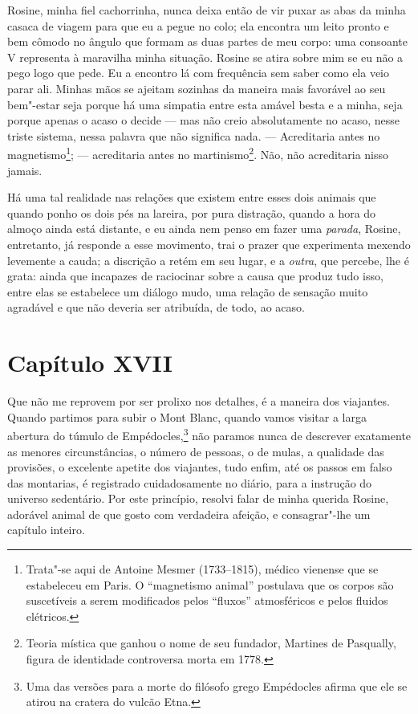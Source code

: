  Rosine, minha fiel cachorrinha, nunca deixa então de vir puxar as abas
da minha casaca de viagem para que eu a pegue no colo; ela encontra um
leito pronto e bem cômodo no ângulo que formam as duas partes de meu
corpo: uma consoante V representa à maravilha minha situação. Rosine se
atira sobre mim se eu não a pego logo que pede. Eu a encontro lá com
frequência sem saber como ela veio parar ali. Minhas mãos se ajeitam
sozinhas da maneira mais favorável ao seu bem"-estar seja porque há uma
simpatia entre esta amável besta e a minha, seja porque apenas o acaso
o decide --- mas não creio absolutamente no acaso, nesse triste
sistema, nessa palavra que não significa nada. --- Acreditaria antes no
magnetismo\footnote{ Trata"-se aqui de Antoine Mesmer (1733--1815),
médico vienense que se estabeleceu em Paris. O ``magnetismo animal''
postulava que os corpos são suscetíveis a serem modificados pelos
``fluxos'' atmosféricos e pelos fluidos elétricos.}; --- acreditaria
antes no martinismo\footnote{ Teoria mística que ganhou o nome de seu
fundador, Martines de Pasqually, figura de identidade controversa morta
em 1778.}. Não, não acreditaria nisso jamais. 

 Há uma tal realidade nas relações que existem entre esses dois animais
que quando ponho os dois pés na lareira, por pura distração, quando a
hora do almoço ainda está distante, e eu ainda nem penso em fazer uma
\textit{parada}, Rosine, entretanto, já responde a esse movimento, trai
o prazer que experimenta mexendo levemente a cauda; a discrição a retém
em seu lugar, e a \textit{outra}, que percebe, lhe é grata: ainda que
incapazes de raciocinar sobre a causa que produz tudo isso, entre elas
se estabelece um diálogo mudo, uma relação de sensação muito agradável
e que não deveria ser atribuída, de todo, ao acaso. 

\section*{Capítulo XVII}

 Que não me reprovem por ser prolixo nos detalhes, é a maneira dos
viajantes. Quando partimos para subir o Mont Blanc, quando vamos
visitar a larga abertura do túmulo de Empédocles,\footnote{ Uma das
versões para a morte do filósofo grego Empédocles afirma que ele se
atirou na cratera do vulcão Etna.} não paramos nunca de descrever
exatamente as menores circunstâncias, o número de pessoas, o de mulas,
a qualidade das provisões, o excelente apetite dos viajantes, tudo
enfim, até os passos em falso das montarias, é registrado
cuidadosamente no diário, para a instrução do universo sedentário. Por
este princípio, resolvi falar de minha querida Rosine, adorável animal
de que gosto com verdadeira afeição, e consagrar"-lhe um capítulo
inteiro. 

